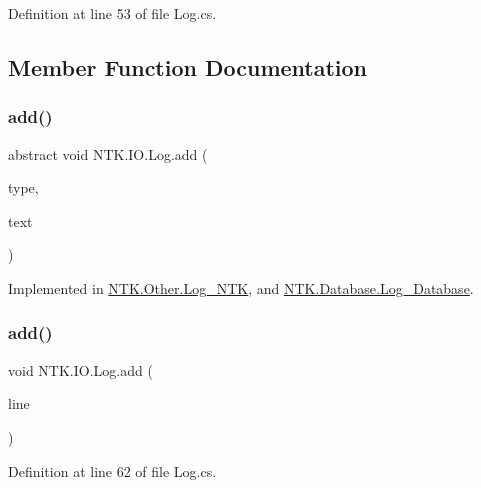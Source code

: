 Definition at line 53 of file Log.\+cs.



\subsection{Member Function Documentation}
\mbox{\label{class_n_t_k_1_1_i_o_1_1_log_a5ffd860f0e7cc3631ae108fc5aca4836}} 
\subsubsection{\texorpdfstring{add()}{add()}\hspace{0.1cm}{\footnotesize\ttfamily [1/2]}}
{\footnotesize\ttfamily abstract void N\+T\+K.\+I\+O.\+Log.\+add (\begin{DoxyParamCaption}\item[{String}]{type,  }\item[{String}]{text }\end{DoxyParamCaption})\hspace{0.3cm}{\ttfamily [pure virtual]}}



Implemented in \mbox{\hyperlink{class_n_t_k_1_1_other_1_1_log___n_t_k_a30a4176c672c4325ca09a068f26a221c}{N\+T\+K.\+Other.\+Log\+\_\+\+N\+TK}}, and \mbox{\hyperlink{class_n_t_k_1_1_database_1_1_log___database_aad5f90e209def99a3e54c8a04417b26f}{N\+T\+K.\+Database.\+Log\+\_\+\+Database}}.

\mbox{\label{class_n_t_k_1_1_i_o_1_1_log_a521fb902fcab4e606227562774d0860c}} 
\subsubsection{\texorpdfstring{add()}{add()}\hspace{0.1cm}{\footnotesize\ttfamily [2/2]}}
{\footnotesize\ttfamily void N\+T\+K.\+I\+O.\+Log.\+add (\begin{DoxyParamCaption}\item[{\mbox{\hyperlink{class_n_t_k_1_1_i_o_1_1_log_line}{Log\+Line}}}]{line }\end{DoxyParamCaption})}



Definition at line 62 of file Log.\+cs.

